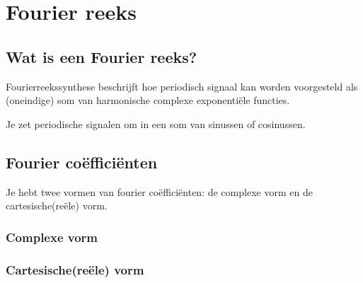 \chapter{Fourier reeks}
\label{ch:fourier_reeks}

\section{Wat is een Fourier reeks?}

Fourierreekssynthese beschrijft hoe periodisch
signaal kan worden voorgesteld als (oneindige) som
van harmonische complexe exponentiële functies.

Je zet periodische signalen om in een som van sinussen of cosinussen.

\section{Fourier coëfficiënten}
Je hebt twee vormen van fourier coëfficiënten: de complexe vorm en de cartesische(reële) vorm.

\subsection{Complexe vorm}

\subsection{Cartesische(reële) vorm}



